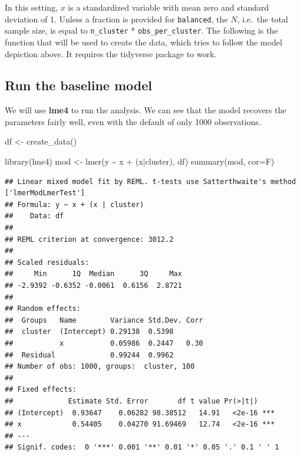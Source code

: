 \documentclass[
  12pt,
]{book}
\newenvironment{Shaded}{\begin{snugshade}}{\end{snugshade}}
\newcommand{\AttributeTok}[1]{\textcolor[rgb]{0.77,0.63,0.00}{#1}}
\newcommand{\FunctionTok}[1]{\textcolor[rgb]{0.00,0.00,0.00}{#1}}
\newcommand{\NormalTok}[1]{#1}
\newcommand{\OtherTok}[1]{\textcolor[rgb]{0.56,0.35,0.01}{#1}}
\newcommand{\SpecialCharTok}[1]{\textcolor[rgb]{0.00,0.00,0.00}{#1}}
\begin{document}
In this setting, \(x\) is a standardized variable with mean zero and standard deviation of 1. Unless a fraction is provided for \texttt{balanced}, the \(N\), i.e.~the total sample size, is equal to \texttt{n\_cluster} * \texttt{obs\_per\_cluster}. The following is the function that will be used to create the data, which tries to follow the model depiction above. It requires the tidyverse package to work.

\hypertarget{run-the-baseline-model}{%
\subsection{Run the baseline model}\label{run-the-baseline-model}}

We will use \textbf{lme4} to run the analysis. We can see that the model recovers the parameters fairly well, even with the default of only 1000 observations.

\begin{Shaded}
\begin{Highlighting}[]
\NormalTok{df }\OtherTok{\textless{}{-}} \FunctionTok{create\_data}\NormalTok{()}

\FunctionTok{library}\NormalTok{(lme4)}
\NormalTok{mod }\OtherTok{\textless{}{-}} \FunctionTok{lmer}\NormalTok{(y }\SpecialCharTok{\textasciitilde{}}\NormalTok{ x }\SpecialCharTok{+}\NormalTok{ (x}\SpecialCharTok{|}\NormalTok{cluster), df)}
\FunctionTok{summary}\NormalTok{(mod, }\AttributeTok{cor=}\NormalTok{F)}
\end{Highlighting}
\end{Shaded}

\begin{verbatim}
## Linear mixed model fit by REML. t-tests use Satterthwaite's method ['lmerModLmerTest']
## Formula: y ~ x + (x | cluster)
##    Data: df
## 
## REML criterion at convergence: 3012.2
## 
## Scaled residuals: 
##     Min      1Q  Median      3Q     Max 
## -2.9392 -0.6352 -0.0061  0.6156  2.8721 
## 
## Random effects:
##  Groups   Name        Variance Std.Dev. Corr
##  cluster  (Intercept) 0.29138  0.5398       
##           x           0.05986  0.2447   0.30
##  Residual             0.99244  0.9962       
## Number of obs: 1000, groups:  cluster, 100
## 
## Fixed effects:
##             Estimate Std. Error       df t value Pr(>|t|)    
## (Intercept)  0.93647    0.06282 98.38512   14.91   <2e-16 ***
## x            0.54405    0.04270 91.69469   12.74   <2e-16 ***
## ---
## Signif. codes:  0 '***' 0.001 '**' 0.01 '*' 0.05 '.' 0.1 ' ' 1
\end{verbatim}
\end{document}
